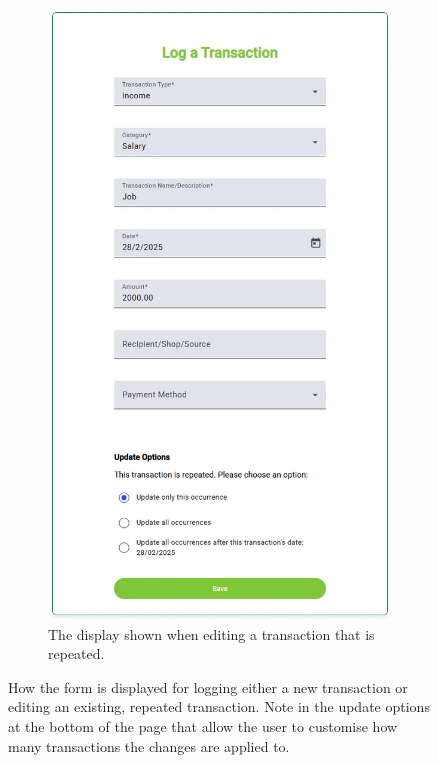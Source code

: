 \documentclass{l4proj}
\begin{document}
\begin{figure}[htb]
    \begin{subfigure}[b]{0.31\textwidth}
        \includegraphics[width=\textwidth]{images/UI-Screenshots/transaction-form-edit.png}
        \caption{The display shown when editing a transaction that is repeated.}
        \label{fig:transaction-form-edit}
    \end{subfigure}   
    \caption{How the form is displayed for logging either a  new transaction or  editing an existing, repeated transaction. Note in  the update options at the bottom of the page that allow the user to customise how many transactions the changes are applied to.
    }\label{fig:screenshots}
\end{figure}
\end{document}
